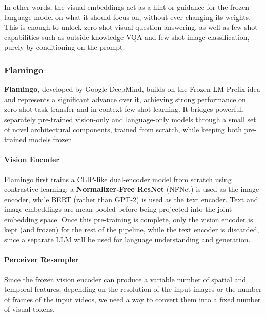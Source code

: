 In other words, the visual embeddings act as a hint or guidance for the frozen language model on what it should focus on, without ever changing its weights. This is enough to unlock zero-shot visual question answering, as well as few-shot capabilities such as outside-knowledge VQA and few-shot image classification, purely by conditioning on the prompt.

\subsubsection{Flamingo}
\textbf{Flamingo}, developed by Google DeepMind, builds on the Frozen LM Prefix idea and represents a significant advance over it, achieving strong performance on zero-shot task transfer and in-context few-shot learning.
It bridges powerful, separately pre-trained vision-only and language-only models through a small set of novel architectural components, trained from scratch, while keeping both pre-trained models frozen.

\paragraph{Vision Encoder} Flamingo first trains a CLIP-like dual-encoder model from scratch using contrastive learning: a \textbf{Normalizer-Free ResNet} (NFNet) is used as the image encoder, while BERT (rather than GPT-2) is used as the text encoder. Text and image embeddings are mean-pooled before being projected into the joint embedding space.
Once this pre-training is complete, only the vision encoder is kept (and frozen) for the rest of the pipeline, while the text encoder is discarded, since a separate LLM will be used for language understanding and generation.

\paragraph{Perceiver Resampler} Since the frozen vision encoder can produce a variable number of spatial and temporal features, depending on the resolution of the input images or the number of frames of the input videos, we need a way to convert them into a fixed number of visual tokens.

